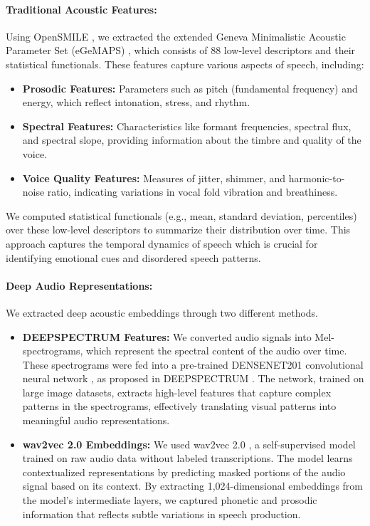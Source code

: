 \documentclass[9pt,a4paper]{rho-class/rho}
\begin{document}
\paragraph{Traditional Acoustic Features:} Using OpenSMILE \cite{eyben2010opensmile}, we extracted the extended Geneva Minimalistic Acoustic Parameter Set (eGeMAPS) \cite{eyben2015geneva}, which consists of 88 low-level descriptors and their statistical functionals. These features capture various aspects of speech, including:
\begin{itemize}
    \item \textbf{Prosodic Features:} Parameters such as pitch (fundamental frequency) and energy, which reflect intonation, stress, and rhythm.
    \item \textbf{Spectral Features:} Characteristics like formant frequencies, spectral flux, and spectral slope, providing information about the timbre and quality of the voice.
    \item \textbf{Voice Quality Features:} Measures of jitter, shimmer, and harmonic-to-noise ratio, indicating variations in vocal fold vibration and breathiness.
\end{itemize}
We computed statistical functionals (e.g., mean, standard deviation, percentiles) over these low-level descriptors to summarize their distribution over time. This approach captures the temporal dynamics of speech which is crucial for identifying emotional cues and disordered speech patterns.

\paragraph{Deep Audio Representations:} We extracted deep acoustic embeddings through two different methods.
\begin{itemize}
    \item \textbf{DEEPSPECTRUM Features:} We converted audio signals into Mel-spectrograms, which represent the spectral content of the audio over time. These spectrograms were fed into a pre-trained DENSENET201 convolutional neural network \cite{huang2017densely}, as proposed in DEEPSPECTRUM \cite{amiriparian2017snore}. The network, trained on large image datasets, extracts high-level features that capture complex patterns in the spectrograms, effectively translating visual patterns into meaningful audio representations.
    \item \textbf{wav2vec 2.0 Embeddings:} We used wav2vec 2.0 \cite{baevski2020wav2vec}, a self-supervised model trained on raw audio data without labeled transcriptions. The model learns contextualized representations by predicting masked portions of the audio signal based on its context. By extracting 1,024-dimensional embeddings from the model's intermediate layers, we captured phonetic and prosodic information that reflects subtle variations in speech production.
\end{itemize}
\end{document}
